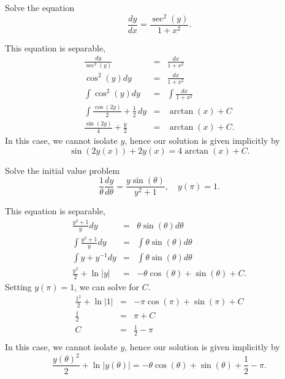 \documentclass[11pt]{article}
\begin{document}
\begin{problem}
Solve the equation
\begin{equation}
     \dfrac{ dy }{dx} = \frac{\sec^2(y)}{1+x^2}.
\end{equation}
\end{problem}
\begin{solution}
This equation is separable,
\begin{eqnarray*}
\frac{dy }{\sec^2(y)}& = & \frac{dx}{1+x^2} \\
\cos^2(y)dy  & = & \frac{dx}{1+x^2} \\
\int \cos^2(y)dy  & = & \int \frac{dx}{1+x^2} \\
\int \frac{\cos(2y)}{2}+ \frac{1}{2} \, dy  & = & \arctan(x)+C \\
\frac{\sin(2y)}{4}+ \frac{y}{2}   & = & \arctan(x)+C.
\end{eqnarray*}
In this case, we cannot isolate $y$, hence our solution is given implicitly by
\begin{equation*}
\boxed{\sin(2y(x))+ 2y(x)  =  4\arctan(x)+C}.
\end{equation*}
\end{solution}




\begin{problem}
Solve the initial value problem
\begin{equation}
     \dfrac{1}{\theta} \dfrac{ dy }{d\theta} = \frac{y \sin(\theta)}{y^2+1}, \quad y(\pi)=1.
\end{equation}
\end{problem}
\begin{solution}
This equation is separable,
\begin{eqnarray*}
\frac{y^2+1}{y} dy & = & \theta \sin(\theta) d\theta \\
\int \frac{y^2+1}{y} dy & = &  \int \theta \sin(\theta) d\theta \\
\int y + y^{-1} dy & = &  \int \theta \sin(\theta) d\theta \\
\frac{y^2}{2} + \ln|y| & = &  -\theta \cos(\theta) + \sin(\theta)+C.
\end{eqnarray*}
Setting $y(\pi)=1$, we can solve for $C$.
\begin{eqnarray*}
\frac{1^2}{2} + \ln|1| & = &  -\pi \cos(\pi) + \sin(\pi)+C \\
\frac{1}{2}  & = &  \pi  + C \\
C  & = & \frac{1}{2} - \pi   \\
\end{eqnarray*}
In this case, we cannot isolate $y$, hence our solution is given implicitly by
\begin{equation*}
\boxed{\frac{y(\theta)^2}{2} + \ln|y(\theta)|  =   -\theta \cos(\theta) + \sin(\theta)+\frac{1}{2} - \pi}.
\end{equation*}
\end{solution}
\end{document}
